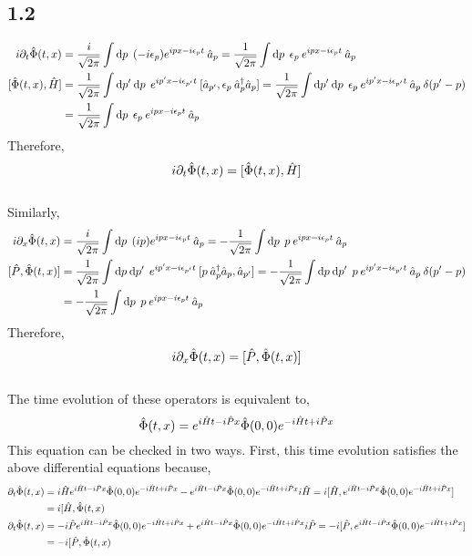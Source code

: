 \documentclass[12pt]{extarticle}
\begin{document}
\subsection*{1.2}
\begin{align*}
i \partial_t \field(t, x) & = \frac{i}{\sqrt{2 \pi}} \int \d{p} \: (- i \epsilon_p) e^{i px - i \epsilon_p t} \: \a_p  = \frac{1}{\sqrt{2 \pi}} \int \d{p} \: \epsilon_p \: e^{i px - i \epsilon_p t} \: \a_p 
\\
[\field(t, x), \hamilt] & = \frac{1}{\sqrt{2 \pi}} \int \d{p'} \d{p} \: e^{i p' x - i \epsilon_{p'} t} \: [\a_{p'},  \epsilon_p \: \adag_p \a_p] = \frac{1}{\sqrt{2 \pi}} \int \d{p'} \d{p} \:  \epsilon_p \: e^{i p' x - i \epsilon_{p'} t} \: \a_p \: \delta(p' - p)
\\
& = \frac{1}{\sqrt{2 \pi}} \int \d{p} \: \epsilon_p \: e^{i p x - i \epsilon_p t} \: \a_p 
\end{align*}
Therefore,
\[ i \partial_t \hat{\Phi}(t, x) = [\hat{\Phi}(t, x), \hat{H}] \] \bigskip \\
Similarly,
\begin{align*}
i \partial_x \field(t, x) & = \frac{i}{\sqrt{2 \pi}} \int \d{p} \: (i p) e^{i px - i \epsilon_p t} \: \a_p  = - \frac{1}{\sqrt{2 \pi}} \int \d{p} \: p \: e^{i px - i \epsilon_p t} \: \a_p 
\\
[\hat{P}, \field(t, x)] & = \frac{1}{\sqrt{2 \pi}} \int \d{p} \d{p'} \: e^{i p' x - i \epsilon_{p'} t} \: [p \: \adag_p \a_p, \a_{p'}] = - \frac{1}{\sqrt{2 \pi}} \int \d{p} \d{p'} \: p \: e^{i p' x - i \epsilon_{p'} t} \: \a_p \: \delta(p' - p)
\\
& = - \frac{1}{\sqrt{2 \pi}} \int \d{p} \: p \: e^{i p x - i \epsilon_p t} \: \a_p 
\end{align*}
Therefore,
\[ i \partial_x \hat{\Phi}(t, x) = [\hat{P}, \hat{\Phi}(t, x)] \] \bigskip \\
The time evolution of these operators is equivalent to,
\[ \hat{\Phi}(t, x) = e^{i \hat{H} t - i \hat{P} x} \hat{\Phi}(0, 0) e^{- i \hat{H} t + i \hat{P} x} \] 
This equation can be checked in two ways. First, this time evolution satisfies the above differential equations because,
\begin{align*}
\partial_t \hat{\Phi}(t, x) & = i \hat{H} e^{i \hat{H} t - i \hat{P} x} \hat{\Phi}(0, 0) e^{- i \hat{H} t + i \hat{P} x} - e^{i \hat{H} t - i \hat{P} x} \hat{\Phi}(0, 0) e^{- i \hat{H} t + i \hat{P} x} i \hat{H} = i [\hat{H}, e^{i \hat{H} t - i \hat{P} x} \hat{\Phi}(0, 0) e^{- i \hat{H} t + i \hat{P} x}] 
\\
& = i [\hat{H}, \hat{\Phi}(t, x)
\\
\partial_t \hat{\Phi}(t, x) & = -i \hat{P} e^{i \hat{H} t - i \hat{P} x} \hat{\Phi}(0, 0) e^{- i \hat{H} t + i \hat{P} x} + e^{i \hat{H} t - i \hat{P} x} \hat{\Phi}(0, 0) e^{- i \hat{H} t + i \hat{P} x} i \hat{P} = - i [\hat{P}, e^{i \hat{H} t - i \hat{P} x} \hat{\Phi}(0, 0) e^{- i \hat{H} t + i \hat{P} x}] 
\\
& = - i [\hat{P}, \hat{\Phi}(t, x)
\end{align*}
\end{document}

